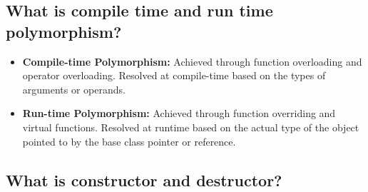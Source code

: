 \subsection{What is compile time and run time polymorphism?}
\begin{itemize}
    \item \textbf{Compile-time Polymorphism:} Achieved through function overloading and operator overloading. Resolved at compile-time based on the types of arguments or operands.
    \item \textbf{Run-time Polymorphism:} Achieved through function overriding and virtual functions. Resolved at runtime based on the actual type of the object pointed to by the base class pointer or reference.
\end{itemize}

\subsection{What is constructor and destructor?}
